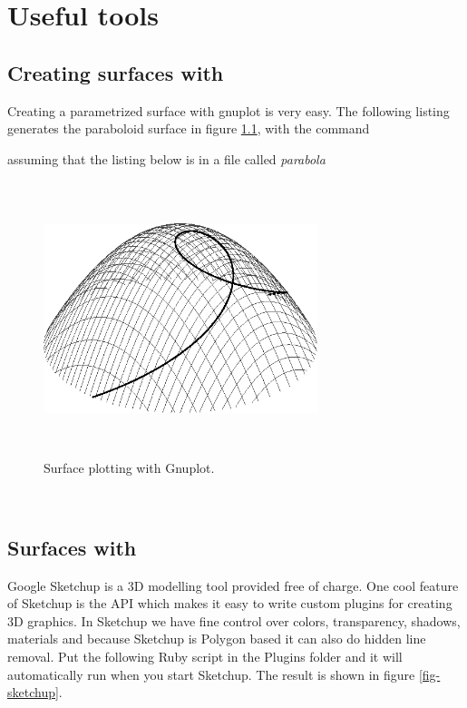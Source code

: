 \chapter{Useful tools}
\label{sec:tools}

\section{Creating surfaces with }
Creating a parametrized surface with gnuplot is very easy. The following listing generates the paraboloid surface in figure \ref{fig-gnuplot}, with the command


assuming that the listing below is in a file called \emph{parabola}

\begin{figure}[!ht]
  \begin{center}
    \includegraphics[width=8cm,height=8cm]{figures/parab}
  \end{center}

  \caption{\small Surface plotting with Gnuplot.}
  \label{fig-gnuplot}
\end{figure}

\lstset{frame=single, basicstyle=\small}
\mbox{
}


\section{Surfaces with }
Google Sketchup is a 3D modelling tool provided free of charge. One cool 
feature of Sketchup is the API which makes it easy to write custom plugins 
for creating 3D graphics. In Sketchup we have fine control over colors, 
transparency, shadows, materials and because Sketchup is Polygon based it 
can also do hidden line removal. Put the following Ruby script in the Plugins 
folder and it will automatically run when you start Sketchup. The result is shown in figure \ref{fig-sketchup}.

